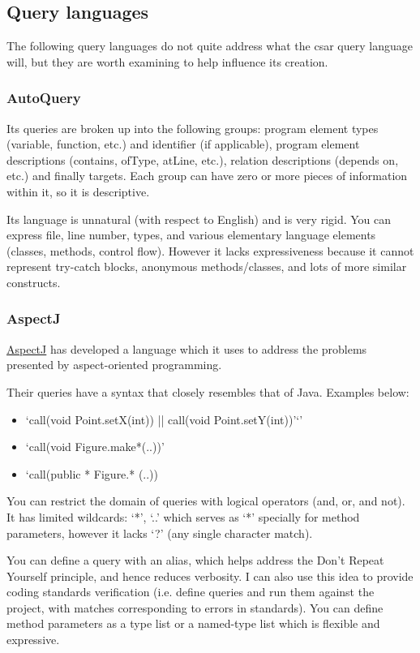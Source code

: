 \documentclass[12pt, letterpaper]{article}
\begin{document}
\subsection{Query languages}
The following query languages do not quite address what the csar query language will, but they are worth examining to help influence its creation.

\subsubsection{AutoQuery}
\label{sec:AutoQuery}
Its queries are broken up into the following groups: program element types (variable, function, etc.) and identifier (if applicable), program element descriptions (contains, ofType, atLine, etc.), relation descriptions (depends on, etc.) and finally targets.
Each group can have zero or more pieces of information within it, so it is descriptive.

Its language is unnatural (with respect to English) and is very rigid.
You can express file, line number, types, and various elementary language elements (classes, methods, control flow).
However it lacks expressiveness because it cannot represent try-catch blocks, anonymous methods/classes, and lots of more similar constructs.

\subsubsection{AspectJ}
\href{https://eclipse.org/aspectj/doc/next/progguide/starting-aspectj.html}{AspectJ} has developed a language which it uses to address the problems presented by aspect-oriented programming.  

Their queries have a syntax that closely resembles that of Java. Examples below:
\begin{itemize}
  \item `call(void Point.setX(int)) || call(void Point.setY(int))'`'
  \item `call(void Figure.make*(..))'
  \item `call(public * Figure.* (..))
\end{itemize}

You can restrict the domain of queries with logical operators (and, or, and not).
It has limited wildcards: `*', `..' which serves as `*' specially for method parameters, however it lacks `?' (any single character match).

You can define a query with an alias, which helps address the Don't Repeat Yourself principle, and hence reduces verbosity.
I can also use this idea to provide coding standards verification (i.e. define queries and run them against the project, with matches corresponding to errors in standards).
You can define method parameters as a type list or a named-type list which is flexible and expressive.
\end{document}
